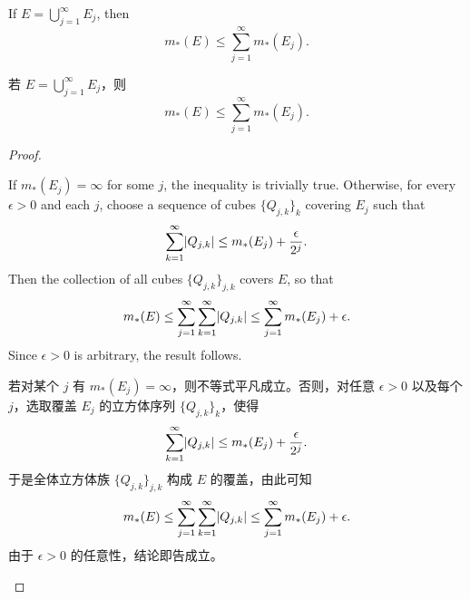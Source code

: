 \begin{theorem}
\label{thm:subadditivity}
\begin{enblock}
If $E = \bigcup_{j=1}^\infty E_j$, then
\[
m_*(E) \le \sum_{j=1}^\infty m_*(E_j).
\]
\end{enblock}
\begin{zhblock}
若 $E = \bigcup_{j=1}^\infty E_j$，则
\[
m_*(E) \le \sum_{j=1}^\infty m_*(E_j).
\]
\end{zhblock}
\end{theorem}

\begin{proof}
\begin{enblock}
If $m_*(E_j) = \infty$ for some $j$, the inequality is trivially true. Otherwise, for every $\epsilon > 0$ and each $j$, choose a sequence of cubes $\{Q_{j,k}\}_k$ covering $E_j$ such that
\[
\sum_{k=1}^\infty \lvert Q_{j,k}\rvert \le m_*(E_j) + \frac{\epsilon}{2^j}.
\]
Then the collection of all cubes $\{Q_{j,k}\}_{j,k}$ covers $E$, so that
\[
m_*(E) \le \sum_{j=1}^\infty \sum_{k=1}^\infty \lvert Q_{j,k}\rvert \le \sum_{j=1}^\infty m_*(E_j) + \epsilon.
\]
Since $\epsilon > 0$ is arbitrary, the result follows.
\end{enblock}
\begin{zhblock}
若对某个 $j$ 有 $m_*(E_j) = \infty$，则不等式平凡成立。否则，对任意 $\epsilon > 0$ 以及每个 $j$，选取覆盖 $E_j$ 的立方体序列 $\{Q_{j,k}\}_k$，使得
\[
\sum_{k=1}^\infty \lvert Q_{j,k}\rvert \le m_*(E_j) + \frac{\epsilon}{2^j}.
\]
于是全体立方体族 $\{Q_{j,k}\}_{j,k}$ 构成 $E$ 的覆盖，由此可知
\[
m_*(E) \le \sum_{j=1}^\infty \sum_{k=1}^\infty \lvert Q_{j,k}\rvert \le \sum_{j=1}^\infty m_*(E_j) + \epsilon.
\]
由于 $\epsilon > 0$ 的任意性，结论即告成立。
\end{zhblock}
\end{proof}
